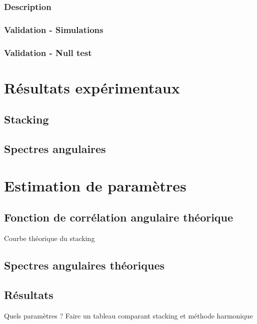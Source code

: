 \subsubsection{Description}
\subsubsection{Validation - Simulations}
\subsubsection{Validation - Null test}


\section{Résultats expérimentaux}
\subsection{Stacking}
\subsection{Spectres angulaires}

\section{Estimation de paramètres}
\subsection{Fonction de corrélation angulaire théorique}
Courbe théorique du stacking
\subsection{Spectres angulaires théoriques}
\subsection{Résultats}
Quels paramètres ?
Faire un tableau comparant stacking et méthode harmonique

